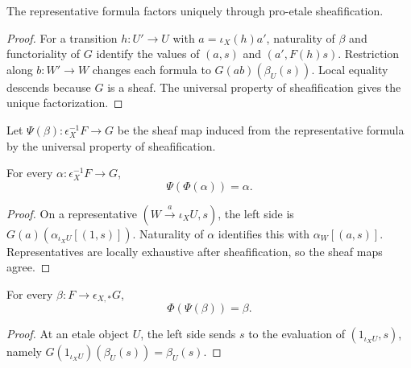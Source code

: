 \begin{lemma}
\label{lemma:weil-efi-site-adjunction-hom-backward-descent}
The representative formula factors uniquely through pro-etale
sheafification.
\end{lemma}
\begin{proof}
For a transition $h:U'\to U$ with $a=\iota_X(h)a'$, naturality of $\beta$
and functoriality of $G$ identify the values of $(a,s)$ and
$(a',F(h)s)$.  Restriction along $b:W'\to W$ changes each formula to
$G(ab)(\beta_U(s))$.  Local equality descends because $G$ is a sheaf.  The
universal property of sheafification gives the unique factorization.
\end{proof}

\begin{definition}
\label{def:weil-efi-site-adjunction-hom-backward}
Let $\Psi(\beta):\epsilon_X^{-1}F\to G$ be the sheaf map induced from the
representative formula by the universal property of sheafification.
\end{definition}

\begin{lemma}
\label{lemma:weil-efi-site-adjunction-hom-left-inverse}
For every $\alpha:\epsilon_X^{-1}F\to G$,
\[
 \Psi(\Phi(\alpha))=\alpha.
\]
\end{lemma}
\begin{proof}
On a representative $(W\xrightarrow a\iota_XU,s)$, the left side is
$G(a)(\alpha_{\iota_XU}[(1,s)])$.  Naturality of $\alpha$ identifies this
with $\alpha_W[(a,s)]$.  Representatives are locally exhaustive after
sheafification, so the sheaf maps agree.
\end{proof}

\begin{lemma}
\label{lemma:weil-efi-site-adjunction-hom-right-inverse}
For every $\beta:F\to\epsilon_{X,*}G$,
\[
 \Phi(\Psi(\beta))=\beta.
\]
\end{lemma}
\begin{proof}
At an etale object $U$, the left side sends $s$ to the evaluation of
$(1_{\iota_XU},s)$, namely
$G(1_{\iota_XU})(\beta_U(s))=\beta_U(s)$.
\end{proof}

